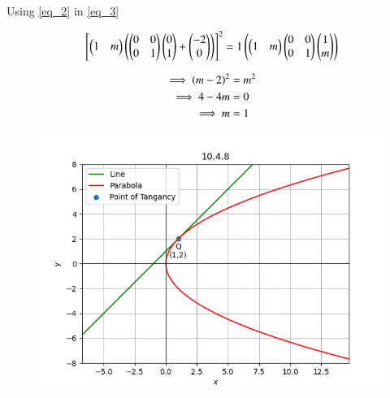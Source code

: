 \documentclass[journal]{IEEEtran}
\numberwithin{equation}{enumi}
\numberwithin{figure}{enumi}
\begin{document}
Using \ref{eq_2} in \ref{eq_3}

\begin{align}
    {}\left[\begin{pmatrix}1 & m \end{pmatrix}\left(\begin{pmatrix}0&0\\0&1\end{pmatrix}\begin{pmatrix}0\\1\end{pmatrix} + \begin{pmatrix}-2\\0\end{pmatrix}\right)\right]^2 = 1\left(\begin{pmatrix}1&m\end{pmatrix}\begin{pmatrix}0&0\\0&1\end{pmatrix}\begin{pmatrix}1\\m\end{pmatrix}\right)
\end{align}

\begin{align}
    \implies \left(m-2\right)^2 &= m^2 \\ 
    \implies 4 - 4m &=   0 \\ 
    \implies m &= 1
\end{align}

\begin{figure}[H]
    \centering
    \includegraphics[width=1\columnwidth]{figs/graph2.png}
    \caption*{}
    \label{fig:placeholder}
\end{figure}
\end{document}
